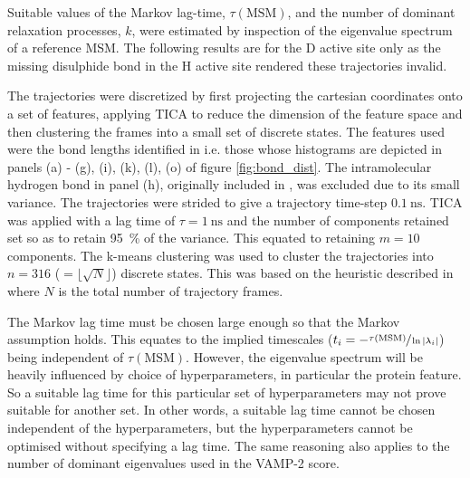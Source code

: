 
Suitable values of the Markov lag-time, $\tau(\mathrm{MSM})$, and  the number of dominant relaxation processes, $k$, were estimated by inspection of the eigenvalue spectrum of a reference MSM. The following results are for the D active site only as the missing disulphide bond in the H active site rendered these trajectories invalid.

The trajectories were discretized by first projecting the cartesian coordinates onto a set of features, applying TICA to reduce the dimension of the feature space and then clustering the frames into a small set of discrete states.  The features used were the bond lengths identified in \cite{ranaghanInitioQMMM2017} i.e. those whose histograms are depicted in panels (a) - (g), (i), (k), (l), (o) of figure \ref{fig:bond_dist}. The intramolecular hydrogen bond in panel (h), originally included in \cite{ranaghanInitioQMMM2017}, was excluded due to its small variance. The trajectories were strided to give a trajectory time-step $\SI{0.1}{\nano\second}$. TICA was applied with a lag time of $\tau=\SI{1}{\nano\second}$ and the number of components retained set so as to retain \SI{95}{\percent} of the variance. This equated to retaining $m=10$ components. The k-means clustering was used to cluster the trajectories into $n = 316$ ($=\lfloor\sqrt{N}\rfloor$) discrete states. This was based on the heuristic described in \cite{husicWardClusteringImproves2017a} where $N$ is the total number of trajectory frames.  

The Markov lag time must be chosen large enough so that the Markov assumption holds. This equates to the implied timescales ($t_{i}=-\sfrac{\tau(\mathrm{MSM})}{\ln{|\lambda_{i}|}}$) being independent of $\tau(\mathrm{MSM})$. However, the eigenvalue spectrum will be heavily influenced by choice of hyperparameters, in particular the protein feature. So a suitable lag time for this particular set of hyperparameters may not prove suitable for another set. In other words, a suitable lag time cannot be chosen independent of the hyperparameters, but the hyperparameters cannot be optimised without specifying a lag time. The same reasoning also applies to the number of dominant eigenvalues used in the VAMP-2 score. 

